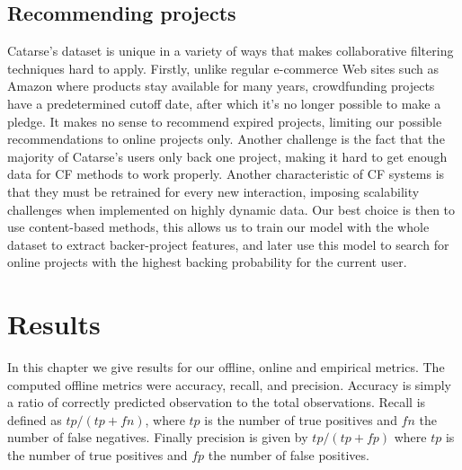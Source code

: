 \documentclass[cic,tc,english]{iiufrgs}
\begin{document}
\section{Recommending projects}
Catarse's dataset is unique in a variety of ways that makes collaborative filtering techniques hard to apply. Firstly, unlike regular e-commerce Web sites such as Amazon where products stay available for many years, crowdfunding projects have a predetermined cutoff date, after which it's no longer possible to make a pledge. It makes no sense to recommend expired projects, limiting our possible recommendations to online projects only. Another challenge is the fact that the majority of Catarse's users only back one project, making it hard to get enough data for CF methods to work properly. Another characteristic of CF systems is that they must be retrained for every new interaction, imposing scalability challenges when implemented on highly dynamic data. Our best choice is then to use content-based methods, this allows us to train our model with the whole dataset to extract backer-project features, and later use this model to search for online projects with the highest backing probability for the current user.




\chapter{Results}
In this chapter we give results for our offline, online and empirical metrics. The computed offline metrics were accuracy, recall, and precision. Accuracy is simply a ratio of correctly predicted observation to the total observations. Recall is defined as $tp / (tp + fn)$, where $tp$ is the number of true positives and $fn$ the number of false negatives. Finally precision is given by $tp / (tp + fp)$ where $tp$ is the number of true positives and $fp$ the number of false positives.
\end{document}
